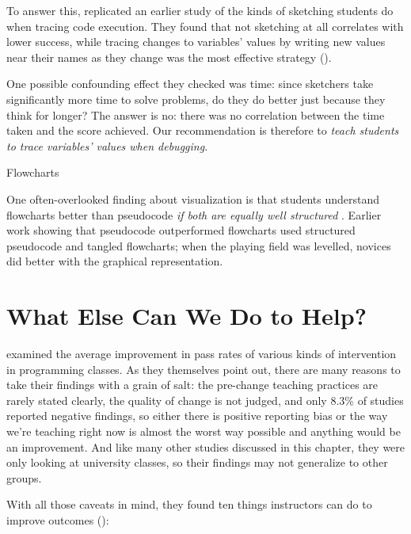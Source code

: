 To answer this, \cite{Cunn2017} replicated an earlier study of the
kinds of sketching students do when tracing code execution.  They
found that not sketching at all correlates with lower success, while
tracing changes to variables' values by writing new values near their
names as they change was the most effective strategy
().

One possible confounding effect they checked was time: since sketchers
take significantly more time to solve problems, do they do better just
because they think for longer?  The answer is no: there was no
correlation between the time taken and the score achieved.  Our
recommendation is therefore to \emph{teach students to trace
  variables' values when debugging}.

\begin{callout}{Flowcharts}

  One often-overlooked finding about visualization is that students
  understand flowcharts better than pseudocode \emph{if both are
    equally well structured} \cite{Scan1989}.  Earlier work showing
  that pseudocode outperformed flowcharts used structured pseudocode
  and tangled flowcharts; when the playing field was levelled, novices
  did better with the graphical representation.

\end{callout}

\section{What Else Can We Do to Help?}\label{s:pck-help}

\cite{Viha2014} examined the average improvement in pass rates of
various kinds of intervention in programming classes.  As they
themselves point out, there are many reasons to take their findings
with a grain of salt: the pre-change teaching practices are rarely
stated clearly, the quality of change is not judged, and only 8.3\% of
studies reported negative findings, so either there is positive
reporting bias or the way we're teaching right now is almost the worst
way possible and anything would be an improvement.  And like many
other studies discussed in this chapter, they were only looking at
university classes, so their findings may not generalize to other
groups.

With all those caveats in mind, they found ten things instructors can
do to improve outcomes ():

